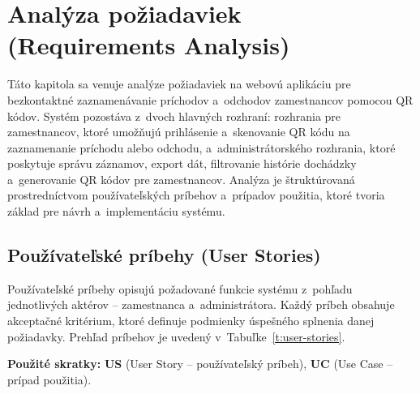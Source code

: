 %
%

\section{Analýza požiadaviek (Requirements Analysis)}

Táto kapitola sa venuje analýze požiadaviek na webovú aplikáciu pre bezkontaktné
zaznamenávanie príchodov a~odchodov zamestnancov pomocou QR kódov. Systém pozostáva
z~dvoch hlavných rozhraní: rozhrania pre zamestnancov, ktoré umožňujú prihlásenie
a~skenovanie QR kódu na zaznamenanie príchodu alebo odchodu, a~administrátorského
rozhrania, ktoré poskytuje správu záznamov, export dát, filtrovanie histórie dochádzky
a~generovanie QR kódov pre zamestnancov. Analýza je štruktúrovaná prostredníctvom
používateľských príbehov a~prípadov použitia, ktoré tvoria základ pre návrh
a~implementáciu systému.

\subsection{Používateľské príbehy (User Stories)}

Používateľské príbehy opisujú požadované funkcie systému z~pohľadu jednotlivých
aktérov -- zamestnanca a~administrátora. Každý príbeh obsahuje akceptačné kritérium,
ktoré definuje podmienky úspešného splnenia danej požiadavky. Prehľad príbehov je
uvedený v~Tabuľke~\ref{t:user-stories}.

\medskip
\noindent\textbf{Použité skratky:} \textbf{US} (User Story -- používateľský príbeh), \textbf{UC} (Use Case -- prípad použitia).

